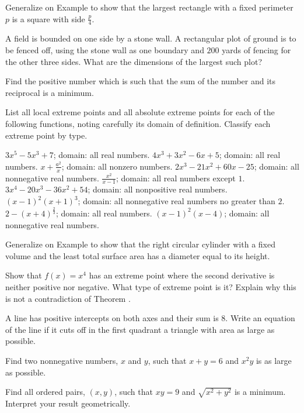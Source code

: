 \begin{exercises}

Generalize on Example  to show that the largest
rectangle with a fixed perimeter $p$ is a square
with side $\frac p4$.

A field is bounded on one side by a stone wall.
A rectangular plot of ground is to be fenced off, using
the stone wall as one boundary and $200$ yards of
fencing for the other three sides.
What are the dimensions of the largest such plot?

Find the positive number which is such that the sum of the number
and its reciprocal is a minimum.

List all local extreme points and all absolute extreme points
for each of the following functions, noting carefully its domain
of definition.  Classify each extreme point by type.
\begin{exenum}
\sx
$3x^5 - 5x^3 + 7$; domain: all real numbers.
\sx
$4x^3 + 3x^2 - 6x + 5$; domain: all real numbers.
\sx
$x + \frac{a^2}x$; domain: all nonzero numbers.
\sx
$2x^3 - 21x^2 + 60x - 25$; domain: all nonnegative real numbers.
\sx
$\frac{x^2}{x-1}$; domain: all real numbers except $1$.
\sx
$3x^4 - 20x^3 - 36x^2 + 54$; domain: all nonpositive real numbers.
\sx
$(x-1)^2(x+1)^3$; domain: all nonnegative real numbers
no greater than $2$.
\sx
$2-(x+4)^\frac23$; domain: all real numbers.
\sx
$(x-1)^2(x-4)$; domain: all nonnegative real numbers. 
\end{exenum}

Generalize on Example  to show that the right circular
cylinder with a fixed volume and the least total surface area
has a diameter equal to its height.

Show that $f(x)=x^4$ has an extreme point where the second
derivative is neither positive nor negative.  What type of extreme
point is it?  Explain why this is not a contradiction of Theorem
.

A line has positive intercepts on both axes and their sum is $8$.
Write an equation of the line if it cuts off in the first quadrant
a triangle with area as large as possible.

Find two nonnegative numbers, $x$ and $y$, such that
$x+y=6$ and $x^2y$ is as large as possible.

Find all ordered pairs, $(x, y)$, such that $xy=9$ and
$\sqrt{x^2 + y^2}$ is a minimum.
Interpret your result geometrically.


\end{exercises}
